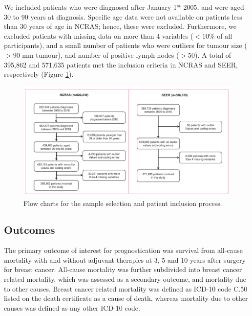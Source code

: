 \documentclass [PhD] {uclathes}
\begin{document}
We included patients who were diagnosed after January 1$^{st}$ 2005, and were aged 30 to 90 years at diagnosis. Specific age data were not available on patients less than 30 years of age in NCRAS; hence, these were excluded. Furthermore, we excluded patients with missing data on more than 4 variables ($<10\%$ of all participants), and a small number of patients who were outliers for tumour size ($>90$ mm tumour), and number of positive lymph nodes ($>50$). A total of 395,862 and 571,635 patients met the inclusion criteria in NCRAS and SEER, respectively (Figure \ref{ch8fig1}). 

\afterpage{\clearpage}
\begin{figure}
   \centering
   \includegraphics[width=8.75in]{ch8Fig1.pdf}
   \caption{Flow charts for the sample selection and patient inclusion process.}
    \label{ch8fig1}
\end{figure} 

\subsection{Outcomes}
The primary outcome of interest for prognostication was survival from all-cause mortality with and without adjuvant therapies at 3, 5 and 10 years after surgery for breast cancer. All-cause mortality was further subdivided into breast cancer related mortality, which was assessed as a secondary outcome, and mortality due to other causes. Breast cancer related mortality was defined as ICD-10 code C.50 listed on the death certificate as a cause of death, whereas mortality due to other causes was defined as any other ICD-10 code. 
\end{document}
